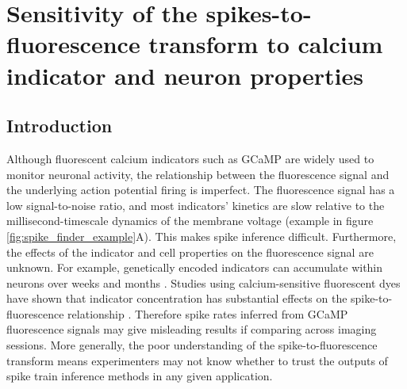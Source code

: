 
\chapter{Sensitivity of the spikes-to-fluorescence transform to calcium indicator and neuron properties} %

\label{chap:calcium} %


\section{Introduction}
Although fluorescent calcium indicators such as GCaMP are widely used to monitor neuronal activity, the relationship between the fluorescence signal and the underlying action potential firing is imperfect. The fluorescence signal has a low signal-to-noise ratio, and most indicators' kinetics are slow relative to the millisecond-timescale dynamics of the membrane voltage (example in figure \ref{fig:spike_finder_example}A). This makes spike inference difficult. Furthermore, the effects of the indicator and cell properties on the fluorescence signal are unknown. For example, genetically encoded indicators can accumulate within neurons over weeks and months  \parencite{chen}. Studies using calcium-sensitive fluorescent dyes have shown that indicator concentration has substantial effects on the spike-to-fluorescence relationship  \parencite{maravall}. Therefore spike rates inferred from GCaMP fluorescence signals may give misleading results if comparing across imaging sessions. More generally, the poor understanding of the spike-to-fluorescence transform means experimenters may not know whether to trust the outputs of spike train inference methods in any given application.

